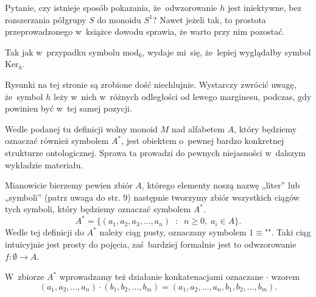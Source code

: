 \documentclass[a4paper,11pt]{article}
\begin{document}
Pytanie, czy istnieje sposób pokazania, że~odwzorowanie $h$ jest
iniektywne, bez rozszerzania półgrupy $S$ do monoidu $S^{ 1 }$? Nawet
jeżeli tak, to prostota przeprowadzonego w~książce dowodu sprawia, że
warto przy nim pozostać.

\vspace{\spaceFour}





\start {} Tak jak w~przypadku symbolu $\textrm{mod}_{ 6 }$,
wydaje mi~się, że~lepiej wyglądałby symbol $\textrm{Ker}_{ h }$.

\vspace{\spaceFour}





\start {} Rysunki na tej stronie są zrobione dość niechlujnie.
Wystarczy zwrócić uwagę, że~symbol $h$ leży w~nich w~różnych odległości od
lewego marginesu, podczas, gdy powinien być w~tej samej pozycji.

\vspace{\spaceFour}





\start {} Wedle podanej tu definicji wolny monoid $M$ nad
alfabetem $A$, który będziemy oznaczać również symbolem $A^{ * }$,
jest obiektem o~pewnej bardzo konkretnej strukturze ontologicznej.
Sprawa ta prowadzi do pewnych niejasności w~dalszym wykładzie
materiału.

Mianowicie bierzemy pewien zbiór $A$, którego elementy noszą nazwę
„liter” lub „symboli” (patrz uwaga do str. 9) następnie tworzymy zbiór
wszystkich ciągów tych symboli, który będziemy oznaczać symbolem
$A^{ * }$.
\begin{equation}
  \label{eq:Forys-Forys-02}
  A^{ * } =
  \{ ( a_{ 1 }, a_{ 2 }, a_{ 3 }, \ldots, a_{ n } ) \;\; : \;\; n \geq 0, \;
  a_{ i } \in A \}.
\end{equation}
Wedle tej definicji do $A^{ * }$ należy ciąg pusty, oznaczany symbolem
$1 \equiv \texttt{""}$. Taki ciąg intuicyjnie jest prosty do pojęcia,
zaś~bardziej formalnie jest to odwzorowanie $f : \emptyset \to A$.

W~zbiorze $A^{ * }$ wprowadzamy też działanie konkatenacjami oznaczane $\cdot$
wzorem
\begin{equation}
  \label{eq:Froys-Forys-03}
  ( a_{ 1 }, a_{ 2 }, \ldots, a_{ n } ) \cdot ( b_{ 1 }, b_{ 2 }, \ldots, b_{ m } ) =
  ( a_{ 1 }, a_{ 2 }, \ldots, a_{ n }, b_{ 1 }, b_{ 2 }, \ldots, b_{ m } ).
\end{equation}
\end{document}
